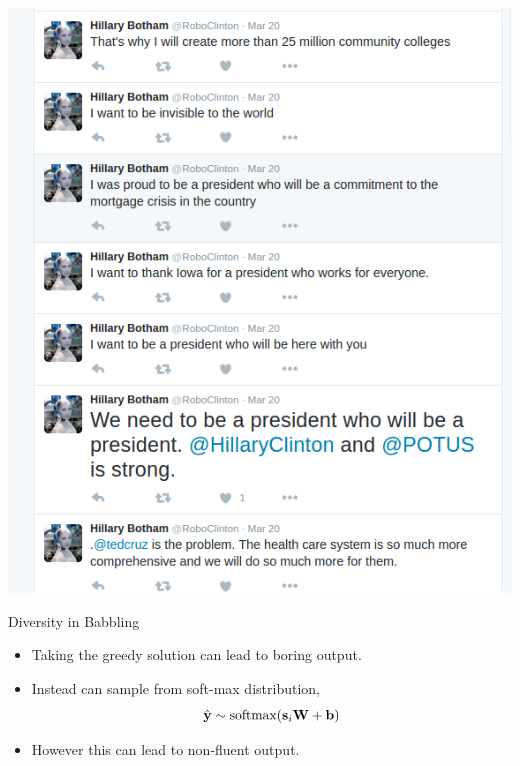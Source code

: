 \documentclass{beamer}
\begin{document}
\begin{frame}{}
  \begin{center}
    \includegraphics[height=0.8\textheight]{hillary}
  \end{center}
\end{frame}


\begin{frame}{Diversity in Babbling}
  \begin{itemize}
  \item Taking the greedy solution can lead to boring output.
    \air 

  \item Instead can  sample from soft-max distribution,
    \[  \hat{\boldy} \sim \softmax(\bolds_i \boldW + \boldb)\]
    \air 

  \item However this can lead to non-fluent output.
  \end{itemize}

\end{frame}
\end{document}
